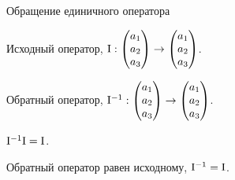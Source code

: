     
    


\begin{frame}{Обращение единичного оператора}

Исходный оператор, $\mathrm{I} : \begin{pmatrix}
  a_1 \\
  a_2 \\
  a_3 \\
\end{pmatrix} \to
\begin{pmatrix}
a_1 \\
a_2 \\
a_3 \\
\end{pmatrix}
$.
\pause

\alert{Обратный оператор},  
$\mathrm{I}^{-1} : \begin{pmatrix}
a_1 \\
a_2 \\
a_3 \\
    \end{pmatrix} \to
  \begin{pmatrix}
a_1 \\
a_2 \\
a_3 \\
    \end{pmatrix}
  $.
\pause

$\mathrm{I}^{-1} \mathrm{I} = \mathrm{I}$.
\pause

Обратный оператор равен исходному, $\mathrm{I}^{-1} = \mathrm{I}$.


\end{frame}
    





